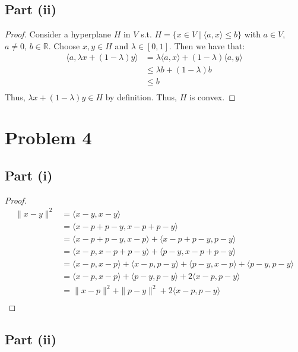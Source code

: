 \documentclass{article}
\begin{document}
\subsection*{Part (ii)}

\begin{proof}
Consider a hyperplane $H$ in $V$ s.t. $H = \{x \in V \mid \langle a, x\rangle \leq b\}$ with $a \in V$, $a \ne 0$, $b \in \mathbb{R}$. Choose $x, y \in H$ and $\lambda \in [0, 1]$. Then we have that:
\begin{align*}
\langle a, \lambda x + (1 - \lambda)y \rangle &= \lambda\langle a, x \rangle + (1 - \lambda)\langle a, y \rangle \\
&\leq \lambda b + (1 - \lambda)b \\
&\leq b \\
\end{align*}
Thus, $\lambda x + (1 - \lambda)y \in H$ by definition. Thus, $H$ is convex.
\end{proof}


\section*{Problem 4}

\subsection*{Part (i)}

\begin{proof}
\begin{align*}
\|x - y\|^2 &= \langle x - y, x - y \rangle \\
&= \langle x - p + p - y, x - p + p - y \rangle \\
&= \langle x - p + p - y, x - p \rangle + \langle x - p + p - y, p - y \rangle \\
&= \langle x - p, x - p + p - y \rangle + \langle p - y, x - p + p - y \rangle \\
&= \langle x - p, x - p \rangle + \langle x - p, p - y \rangle + \langle p - y, x - p \rangle + \langle p - y, p - y \rangle \\
&= \langle x - p, x - p \rangle + \langle p - y, p - y \rangle + 2 \langle x - p, p - y \rangle \\
&= \|x - p\|^2 + \|p - y\|^2 + 2 \langle x - p, p - y \rangle \\
\end{align*}
\end{proof}

\subsection*{Part (ii)}
\end{document}

